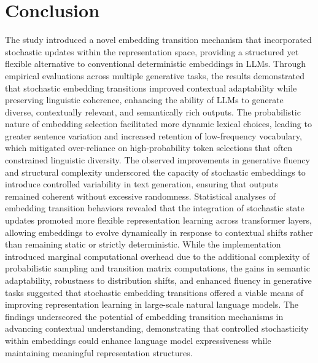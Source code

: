 \documentclass{article}
\begin{document}
\section{Conclusion}

The study introduced a novel embedding transition mechanism that incorporated stochastic updates within the representation space, providing a structured yet flexible alternative to conventional deterministic embeddings in LLMs. Through empirical evaluations across multiple generative tasks, the results demonstrated that stochastic embedding transitions improved contextual adaptability while preserving linguistic coherence, enhancing the ability of LLMs to generate diverse, contextually relevant, and semantically rich outputs. The probabilistic nature of embedding selection facilitated more dynamic lexical choices, leading to greater sentence variation and increased retention of low-frequency vocabulary, which mitigated over-reliance on high-probability token selections that often constrained linguistic diversity. The observed improvements in generative fluency and structural complexity underscored the capacity of stochastic embeddings to introduce controlled variability in text generation, ensuring that outputs remained coherent without excessive randomness. Statistical analyses of embedding transition behaviors revealed that the integration of stochastic state updates promoted more flexible representation learning across transformer layers, allowing embeddings to evolve dynamically in response to contextual shifts rather than remaining static or strictly deterministic. While the implementation introduced marginal computational overhead due to the additional complexity of probabilistic sampling and transition matrix computations, the gains in semantic adaptability, robustness to distribution shifts, and enhanced fluency in generative tasks suggested that stochastic embedding transitions offered a viable means of improving representation learning in large-scale natural language models. The findings underscored the potential of embedding transition mechanisms in advancing contextual understanding, demonstrating that controlled stochasticity within embeddings could enhance language model expressiveness while maintaining meaningful representation structures.





\end{document}
